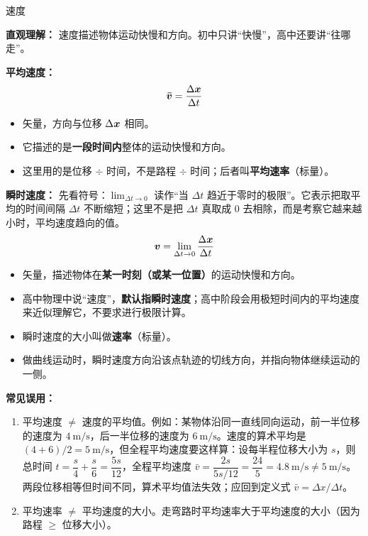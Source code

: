 \begin{conceptbox}{速度}

\textbf{直观理解：} 速度描述物体运动快慢和方向。初中只讲“快慢”，高中还要讲“往哪走”。

\textbf{平均速度：}
\[
\boldsymbol{\bar{v}} = \frac{\Delta \boldsymbol{x}}{\Delta t}
\]
\begin{itemize}
  \item 矢量，方向与位移 $\Delta \boldsymbol{x}$ 相同。
  \item 它描述的是\textbf{一段时间内}整体的运动快慢和方向。
  \item 这里用的是位移 $\div$ 时间，不是路程 $\div$ 时间；后者叫\textbf{平均速率}（标量）。
\end{itemize}

\textbf{瞬时速度：}
先看符号：$\lim_{\Delta t\to0}$ 读作“当 $\Delta t$ 趋近于零时的极限”。它表示把取平均的时间间隔 $\Delta t$ 不断缩短；这里不是把 $\Delta t$ 真取成 $0$ 去相除，而是考察它越来越小时，平均速度趋向的值。
\[
\boldsymbol{v} = \lim_{\Delta t \to 0} \frac{\Delta \boldsymbol{x}}{\Delta t}
\]
\begin{itemize}
  \item 矢量，描述物体在\textbf{某一时刻（或某一位置）}的运动快慢和方向。
  \item 高中物理中说“速度”，\textbf{默认指瞬时速度}；高中阶段会用极短时间内的平均速度来近似理解它，不要求进行极限计算。
  \item 瞬时速度的大小叫做\textbf{速率}（标量）。
  \item 做曲线运动时，瞬时速度方向沿该点轨迹的切线方向，并指向物体继续运动的一侧。
\end{itemize}

\textbf{常见误用：}
\begin{enumerate}
  \item 平均速度 $\neq$ 速度的平均值。例如：某物体沿同一直线同向运动，前一半位移的速度为 $4\ \mathrm{m/s}$，后一半位移的速度为 $6\ \mathrm{m/s}$。速度的算术平均是 $(4+6)/2 = 5\ \mathrm{m/s}$，但全程平均速度要这样算：设每半程位移大小为 $s$，则总时间 $t = \dfrac{s}{4} + \dfrac{s}{6} = \dfrac{5s}{12}$，全程平均速度 $\bar{v} = \dfrac{2s}{5s/12} = \dfrac{24}{5} = 4.8\ \mathrm{m/s} \neq 5\ \mathrm{m/s}$。两段位移相等但时间不同，算术平均值法失效；应回到定义式 $\bar{v}=\Delta x/\Delta t$。
  \item 平均速率 $\neq$ 平均速度的大小。走弯路时平均速率大于平均速度的大小（因为路程 $\geq$ 位移大小）。
\end{enumerate}

\end{conceptbox}

